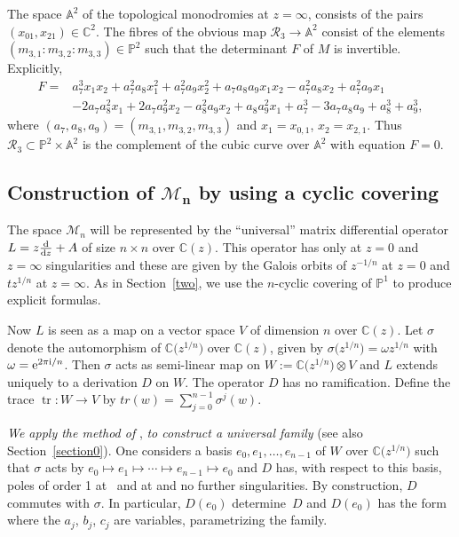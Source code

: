 \documentclass[10pt,a4paper]{amsart}
\numberwithin{equation}{section}
\begin{document}
The space $\mathbb{A}^2$ of the topological monodromies at $z=\infty$, consists of the pairs $(x_{01},x_{21})\in \mathbb{C}^2$. The fibres of the obvious map $\mathcal{R}_3\rightarrow \mathbb{A}^2$ consist of the elements
$(m_{3,1}:m_{3,2}:m_{3,3})\in \mathbb{P}^2$ such that the determinant $F$ of $M$ is invertible. Explicitly,
 \begin{align*}
 F={}&a_7^3x_1x_2 + a_7^2a_8x_1^2 + a_7^2a_9x_2^2 + a_7a_8a_9x_1x_2
-a_7^2a_8x_2 + a_7^2a_9x_1 \\ &- 2a_7a_8^2x_1 + 2a_7a_9^2x_2 - a_8^2a_9x_2
 + a_8a_9^2x_1 + a_7^3 - 3a_7a_8a_9 + a_8^3 + a_9^3,
 \end{align*}
where $(a_7,a_8,a_9)=(m_{3,1},m_{3,2},m_{3,3})$ and $x_1=x_{0,1}$, $ x_2=x_{2,1}$.
Thus $\mathcal{R}_3\subset \mathbb{P}^2\times \mathbb{A}^2$ is the complement of the cubic curve
over $\mathbb{A}^2$ with equation $F=0$.

\subsection[Construction of M\_n by using a cyclic covering]{Construction of $\boldsymbol{\mathcal{M}_n}$ by using a cyclic covering}

The space $\mathcal{M}_n$ will be represented by the ``universal'' matrix differential operator
 $L=z\frac{{\rm d}}{{\rm d}z}+A$ of size $n\times n$ over $\mathbb{C}(z)$. This operator has only at $z=0$ and $z=\infty$ singularities
and these are given by the Galois orbits of $z^{-1/n}$ at $z=0$ and $tz^{1/n}$ at $z=\infty$.
As in Section~\ref{two}, we use the $n$-cyclic covering of $\mathbb{P}^1$ to produce explicit formulas.

Now $L$ is seen as a map on a vector space $V$ of dimension $n$ over $\mathbb{C}(z)$. Let $\sigma$ denote
the automorphism of $\mathbb{C}\bigl(z^{1/n}\bigr)$ over $\mathbb{C}(z)$, given by $\sigma \bigl(z^{1/n}\bigr)=\omega z^{1/n}$ with $\omega={\rm e}^{2\pi {\rm i} /n}$.
Then $\sigma$ acts as semi-linear map on $W:=\mathbb{C}\bigl(z^{1/n}\bigr)\otimes V$ and $L$ extends uniquely to
a derivation $D$ on $W$. The operator $D$ has no ramification.
Define the trace $\operatorname{tr}\colon W\rightarrow V$ by $tr(w)=\sum _{j=0}^{n-1}\sigma^j(w)$.

{\it We apply the method of} \cite[Chapter~12]{vdP-Sa}, {\it to construct a universal family} (see also
Section~\ref{section0}).
 One considers a basis $e_0,e_1,\dots ,e_{n-1}$ of $W$ over $\mathbb{C}\bigl(z^{1/n}\bigr)$ such that $\sigma$ acts by
 $e_0\mapsto e_1 \mapsto \cdots \mapsto e_{n-1}\mapsto e_0$ and $D$ has, with respect to this basis, poles of order 1
 at~ and at  and no further singularities. By construction, $D$ commutes with
$\sigma$. In particular, $D(e_0)$ determine~$D$ and $D(e_0)$ has the form
 where the $a_j$, $b_j$, $c_j$ are variables, parametrizing the family.
\end{document}
